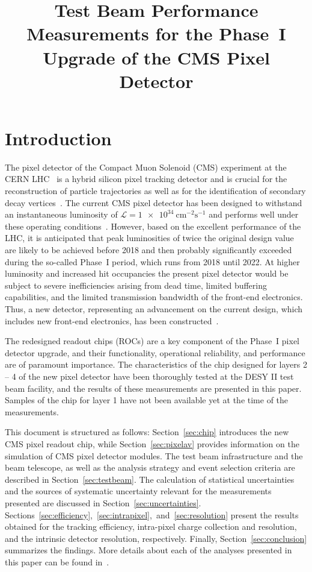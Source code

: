\documentclass[a4paper,11pt]{article}
\title{Test Beam Performance Measurements for the Phase~I Upgrade of the CMS Pixel Detector}
\begin{document}
\maketitle
\flushbottom

\section{Introduction}

The pixel detector of the Compact Muon Solenoid (CMS) experiment at the CERN LHC~\cite{JINST-cms} is a hybrid silicon pixel tracking detector and is crucial for the reconstruction of particle trajectories as well as for the identification of secondary decay vertices~\cite{CMS-TDR-tracker,CMS-TDR-tracker-add}.
The current CMS pixel detector has been designed to withstand an instantaneous luminosity of $\mathcal{L} =  \SI{1e34}{\centi\meter^{-2}\second^{-1}}$ and performs well under these operating conditions~\cite{tracker-reco}.
However, based on the excellent performance of the LHC, it is anticipated that peak luminosities of twice the original design value are likely to be achieved before 2018 and then probably significantly exceeded during the so-called Phase~I period, which runs from 2018 until 2022.
At higher luminosity and increased hit occupancies the present pixel detector would be subject to severe inefficiencies arising from dead time, limited buffering capabilities, and the limited transmission bandwidth of the front-end electronics.
Thus, a new detector, representing an advancement on the current design, which includes new front-end electronics, has been constructed~\cite{pixel-tdr}.

The redesigned readout chips (ROCs) are a key component of the Phase~I pixel detector upgrade, and their functionality, operational reliability, and performance are of paramount importance.
The characteristics of the chip designed for layers 2 -- 4 of the new pixel detector have been thoroughly tested at the DESY II test beam facility, and the results of these measurements are presented in this paper.
Samples of the chip for layer 1 have not been available yet at the time of the measurements.

This document is structured as follows:
Section~\ref{sec:chip} introduces the new CMS pixel readout chip, while Section~\ref{sec:pixelav} provides information on the simulation of CMS pixel detector modules.
The test beam infrastructure and the beam telescope, as well as the analysis strategy and event selection criteria are described in Section~\ref{sec:testbeam}.
The calculation of statistical uncertainties and the sources of systematic uncertainty relevant for the measurements presented are discussed in Section~\ref{sec:uncertainties}.
Sections~\ref{sec:efficiency},~\ref{sec:intrapixel},~and~\ref{sec:resolution} present the results obtained for the tracking efficiency, intra-pixel charge collection and resolution, and the intrinsic detector resolution, respectively.
Finally, Section~\ref{sec:conclusion} summarizes the findings.
More details about each of the analyses presented in this paper can be found in~\cite{thesis-simon}.
\end{document}
